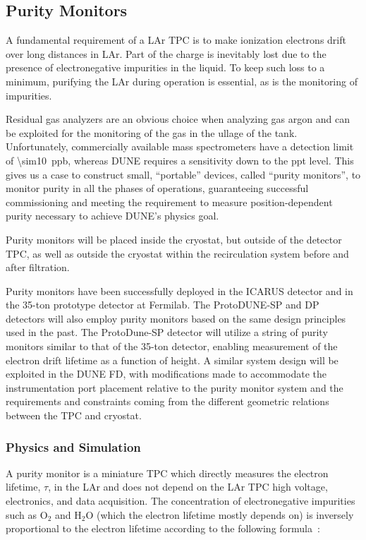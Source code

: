 \subsection{Purity Monitors} 
\label{sec:fdsp-slow-cryo-purity-mon}
A fundamental requirement of a LAr TPC is to make ionization electrons drift over long distances in LAr. Part of the charge is inevitably lost due to the presence of electronegative impurities in the liquid. To keep such loss to a minimum, purifying the LAr during operation is essential, as is the monitoring of impurities.

Residual gas analyzers are an obvious choice when analyzing gas argon and can be exploited for the monitoring of the gas in the ullage of the tank. Unfortunately, commercially available mass spectrometers have a detection limit of \SI{\sim10}{ppb}, whereas DUNE requires a sensitivity down to the \si{ppt} level. This gives us a case to construct small, ``portable'' devices, called ``purity monitors'', to monitor purity in all the phases of operations, guaranteeing successful commissioning and meeting the requirement to measure position-dependent purity necessary to achieve DUNE's physics goal. 

Purity monitors will be placed inside the cryostat, but outside of the detector TPC, as well as outside the cryostat within the recirculation system before and after filtration.

Purity monitors have been successfully deployed in the ICARUS detector and in the 35-ton prototype detector at Fermilab. The ProtoDUNE-SP and DP detectors will also employ purity monitors based on the same design principles used in the past. The ProtoDune-SP detector will utilize a string of purity monitors similar to that of the 35-ton detector, enabling measurement of the electron drift lifetime as a function of height.  A similar system design will be exploited in the DUNE FD, with modifications made to accommodate the instrumentation port placement relative to the purity monitor system and the requirements and constraints coming from the different geometric relations between the TPC and cryostat. 

\subsubsection{Physics and Simulation}
A purity monitor is a miniature TPC which directly measures the electron lifetime, $\tau$, in the LAr and does not depend on the LAr TPC high voltage, electronics, and data acquisition. The concentration of electronegative impurities such as $\text{O}_2$ and $\text{H}_2\text{O}$ (which the electron lifetime mostly depends on) is inversely proportional to the electron lifetime according to the following formula~\cite{BakaleSowadaSchmidt}:

